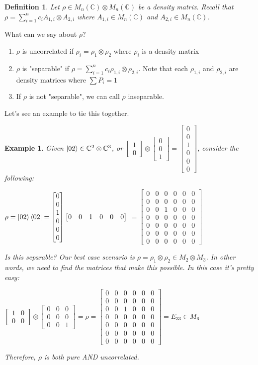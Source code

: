 \documentclass[12pt]{article}
\theoremstyle{plain}
\theoremstyle{nonumberplain}
\theoremstyle{plain}
\newtheorem{definition}[lemma]{Definition}
\newtheorem{example}[lemma]{Example}
\theoremstyle{nonumberplain}
\newcommand\1{{\bf 1}}
\newcommand{\bmat}[1]{\begin{bmatrix*} #1 \end{bmatrix*}} %
\newcommand{\C}{\mathbb{C}} %
\newcommand{\<}{\left\langle}
\renewcommand{\>}{\right\rangle}
\begin{document}
\begin{definition}
Let $\rho\in M_n(\C)\otimes M_n(\C)$ be a density matrix. Recall that $\rho=\sum^n_{i=1}c_iA_{1,i}\otimes A_{2,i}$ where $A_{1,i}\in M_n(\C)$ and $A_{2,i}\in M_n(\C)$.
\end{definition}
What can we say about $\rho$?
\begin{enumerate}
\item $\rho$ is uncorrelated if $\rho_i=\rho_1\otimes\rho_2$ where $\rho_i$ is a density matrix
\item $\rho$ is "separable" if $\rho=\sum^n_{i=1}c_i\rho_{1,i}\otimes \rho_{2,i}$. Note that each $\rho_{1,i}$ and $\rho_{2,i}$ are density matrices where $\sum P_i=1$
\item If $\rho$ is not "separable", we can call $\rho$ inseparable.
\end{enumerate}
Let's see an example to tie this together.
\begin{example}
Given $\ket{02}\in\C^2\otimes\C^3$, or $\bmat{1 \\ 0}\otimes\bmat{0 \\ 0 \\ 1}=\bmat{0 \\ 0 \\ 1 \\ 0 \\ 0 \\ 0}$, consider the following:
\begin{center}
$\rho=\ket{02}\bra{02}=\bmat{0 \\ 0 \\ 1 \\ 0 \\ 0 \\ 0}\bmat{0 & 0 & 1 & 0 & 0 & 0}$
$=\bmat{
0 & 0 & 0 & 0 & 0 & 0 \\
0 & 0 & 0 & 0 & 0 & 0 \\
0 & 0 & 1 & 0 & 0 & 0 \\
0 & 0 & 0 & 0 & 0 & 0 \\
0 & 0 & 0 & 0 & 0 & 0 \\
0 & 0 & 0 & 0 & 0 & 0 \\
0 & 0 & 0 & 0 & 0 & 0
}$
\end{center}
Is this separable? Our best case scenario is $\rho=\rho_1\otimes\rho_2\in M_2\otimes M_3$. In other words, we need to find the matrices that make this possible. In this case it's pretty easy:
\begin{center}
$\bmat{
1 & 0 \\
0 & 0
}\otimes\bmat{
0 & 0 & 0 \\
0 & 0 & 0 \\
0 & 0 & 1
}=\rho=\bmat{
0 & 0 & 0 & 0 & 0 & 0 \\
0 & 0 & 0 & 0 & 0 & 0 \\
0 & 0 & 1 & 0 & 0 & 0 \\
0 & 0 & 0 & 0 & 0 & 0 \\
0 & 0 & 0 & 0 & 0 & 0 \\
0 & 0 & 0 & 0 & 0 & 0 \\
0 & 0 & 0 & 0 & 0 & 0
}=E_{33}\in M_6$
\end{center}
Therefore, $\rho$ is both pure AND uncorrelated.
\end{example}
\end{document}
